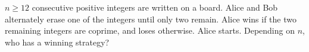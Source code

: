 $n \geq 12$ consecutive positive integers are written on a board. Alice and Bob alternately erase one of the integers until only two remain. Alice wins if the two remaining integers are coprime, and loses otherwise. Alice starts. Depending on $n$, who has a winning strategy?
